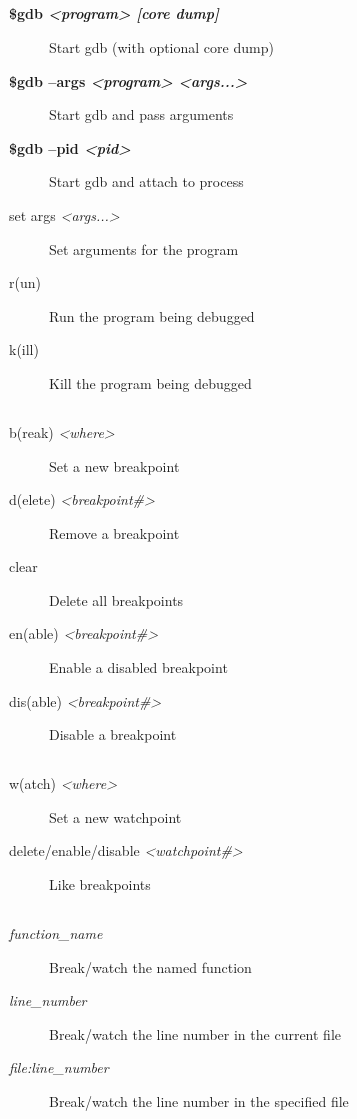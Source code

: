 \documentclass[10pt,landscape,a4paper]{article}
\newcommand{\blacksubsection}[1]{\subsection{\colorbox{black}{\makebox[\linewidth][c]{\textcolor{white}{#1}}}}}
\begin{document}
  \begin{multicols}{3}
    \blacksubsection{Running}
      \begin{description}
        \item[{\bfseries \$gdb \textit{<program> [core dump]}}] Start gdb (with optional core dump)
        \item[{\bfseries \$gdb --args \textit{<program> <args...>}}] Start gdb and pass arguments
        \item[{\bfseries \$gdb --pid \textit{<pid>}}] Start gdb and attach to process
        \item[set args \textit{<args...>}] Set arguments for the program
        \item[r(un)] Run the program being debugged
        \item[k(ill)] Kill the program being debugged
      \end{description}

    \blacksubsection{Breakpoints}
      \begin{description}
        \item[b(reak) \textit{<where>}] Set a new breakpoint
        \item[d(elete) \textit{<breakpoint\#>}] Remove a breakpoint
        \item[clear] Delete all breakpoints
        \item[en(able) \textit{<breakpoint\#>}] Enable a disabled breakpoint
        \item[dis(able) \textit{<breakpoint\#>}] Disable a breakpoint
      \end{description}

    \blacksubsection{Watchpoints}
      \begin{description}
        \item[w(atch) \textit{<where>}] Set a new watchpoint
        \item[delete/enable/disable \textit{<watchpoint\#>}] Like breakpoints
      \end{description}

    \blacksubsection{<where>}
      \begin{description}
        \item[\textit{function\_name}] Break/watch the named function
        \item[\textit{line\_number}] Break/watch the line number in the current file
        \item[\textit{file:line\_number}]  Break/watch the line number in the specified file 
      \end{description}


\end{multicols}
\end{document}

